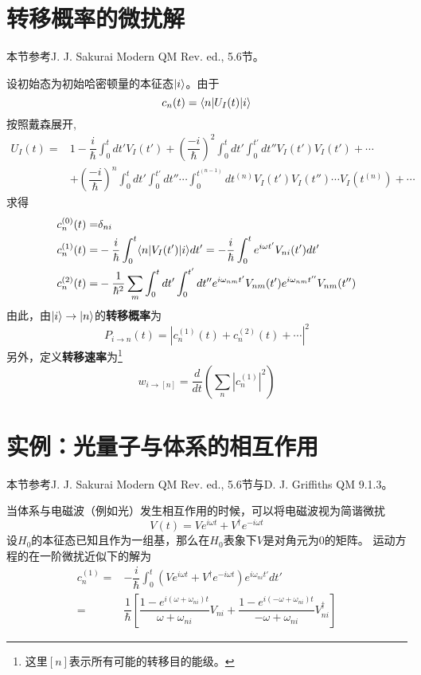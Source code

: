 \section{转移概率的微扰解}
\begin{framed}
本节参考J. J. Sakurai Modern QM Rev. ed., 5.6节。
\end{framed}
设初始态为初始哈密顿量的本征态$ |i\rangle $。由于
\begin{equation}\label{key}
c_n(t)=\langle n| U_I(t)|i\rangle
\end{equation}
按照戴森展开,
\begin{align}\label{key}
U_I(t)=&1-\dfrac{i}{\hbar}\int_0^tdt'V_I(t')+\left(\dfrac{-i}{\hbar}\right)^2\int_0^tdt'\int_0^{t'}dt''V_I(t')V_I(t')+\cdots\nonumber\\
&+\left(\dfrac{-i}{\hbar}\right)^n\int_0^tdt'\int_0^{t'}dt''\cdots\int_0^{t^{(n-1)}}dt^{(n)}V_I(t')V_I(t'')\cdots V_I(t^{(n)})+\cdots
\end{align}
求得
\begin{align}
c_n^{(0)}(t)=&\delta_{ni}\\
c_n^{(1)}(t)=&-\dfrac{i}{\hbar}\int_0^t\langle n|V_I(t')|i\rangle dt'=-\dfrac{i}{\hbar}\int_0^t e^{i\omega t'}V_{ni}(t') dt'\\
c_n^{(2)}(t)=&-\dfrac{1}{\hbar^2}\sum_m\int_0^tdt'\int_0^{t'}dt''e^{i\omega_{nm}t'}V_{nm}(t')e^{i\omega_{nm}t''}V_{nm}(t'')
\end{align}
由此，由$ |i\rangle\to|n\rangle $的\textbf{转移概率}为
\begin{equation}\label{key}
P_{i\to n}(t)=|c_n^{(1)}(t)+c_n^{(2)}(t)+\cdots|^2
\end{equation}
另外，定义\textbf{转移速率}为\footnote{这里$ [n] $表示所有可能的转移目的能级。}
\begin{equation}\label{key}
w_{i\to [n]}=\dfrac{d}{dt}\left(\sum_n|c_n^{(1)}|^2\right)
\end{equation}
\section{实例：光量子与体系的相互作用}
\begin{framed}
本节参考J. J. Sakurai Modern QM Rev. ed., 5.6节与D. J. Griffiths QM 9.1.3。
\end{framed}

当体系与电磁波（例如光）发生相互作用的时候，可以将电磁波视为简谐微扰
\begin{equation}\label{key}
V(t)=Ve^{i\omega t}+V^\dagger e^{-i\omega t}
\end{equation}
设$ H_0 $的本征态已知且作为一组基，那么在$ H_0 $表象下$ V $是对角元为0的矩阵。
运动方程的在一阶微扰近似下的解为
\begin{align}\label{lit}
c_n^{(1)}=&-\dfrac{i}{\hbar}\int_0^t(Ve^{i\omega t}+V^\dagger e^{-i\omega t})e^{i\omega_{ni} t'}dt'\nonumber\\
=&\dfrac{1}{\hbar}\left[\dfrac{1-e^{i(\omega+\omega_{ni})t}}{\omega+\omega_{ni}}V_{ni}+\dfrac{1-e^{i(-\omega+\omega_{ni})t}}{-\omega+\omega_{ni}}V_{ni}^\dagger\right]
\end{align}

